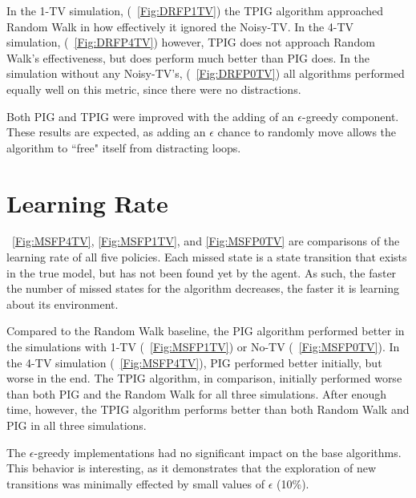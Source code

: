 \documentclass[12pt]{thesis}
\begin{document}
In the 1-TV simulation, (\figurename~\ref{Fig:DRFP1TV}) the TPIG algorithm approached Random Walk in how effectively it ignored the Noisy-TV. In the 4-TV simulation, (\figurename~\ref{Fig:DRFP4TV}) however, TPIG does not approach Random Walk's effectiveness, but does perform much better than PIG does. In the simulation without any Noisy-TV's, (\figurename~\ref{Fig:DRFP0TV}) all algorithms performed equally well on this metric, since there were no distractions.


Both PIG and TPIG were improved with the adding of an $\epsilon$-greedy component. These results are expected, as adding an $\epsilon$ chance to randomly move allows the algorithm to ``free" itself from distracting loops.



\section{Learning Rate}
\figurename~\ref{Fig:MSFP4TV}, \ref{Fig:MSFP1TV}, and \ref{Fig:MSFP0TV} are comparisons of the learning rate of all five policies. Each missed state is a state transition that exists in the true model, but has not been found yet by the agent. As such, the faster the number of missed states for the algorithm decreases, the faster it is learning about its environment.

Compared to the Random Walk baseline, the PIG algorithm performed better in the simulations with 1-TV (\figurename~\ref{Fig:MSFP1TV}) or No-TV (\figurename~\ref{Fig:MSFP0TV}). In the 4-TV simulation (\figurename~\ref{Fig:MSFP4TV}), PIG performed better initially, but worse in the end. The TPIG algorithm, in comparison, initially performed worse than both PIG and the Random Walk for all three simulations. After enough time, however, the TPIG algorithm performs better than both Random Walk and PIG in all three simulations.

The $\epsilon$-greedy implementations had no significant impact on the base algorithms. This behavior is interesting, as it demonstrates that the exploration of new transitions was minimally effected by small values of $\epsilon$ (10\%).
\end{document}
